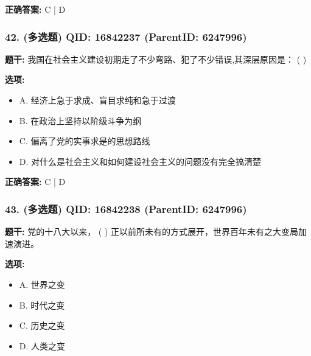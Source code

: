 \documentclass[12pt,UTF8]{ctexart}
\begin{document}
\textbf{正确答案:}
C | D

\vspace{0.3em}\hrulefill\vspace{0.7em}

\subsubsection*{42. (多选题) \small QID: 16842237 (ParentID: 6247996)}

\textbf{题干:}
我国在社会主义建设初期走了不少弯路、犯了不少错误,其深层原因是： ( )



\textbf{选项:}
\begin{itemize}[leftmargin=*]

  \item A. 经济上急于求成、盲目求纯和急于过渡

  \item B. 在政治上坚持以阶级斗争为纲

  \item C. 偏离了党的实事求是的思想路线

  \item D. 对什么是社会主义和如何建设社会主义的问题没有完全搞清楚

\end{itemize}

\textbf{正确答案:}
C | D

\vspace{0.3em}\hrulefill\vspace{0.7em}

\subsubsection*{43. (多选题) \small QID: 16842238 (ParentID: 6247996)}

\textbf{题干:}
党的十八大以来， ( ) 正以前所未有的方式展开，世界百年未有之大变局加速演进。



\textbf{选项:}
\begin{itemize}[leftmargin=*]

  \item A. 世界之变

  \item B. 时代之变

  \item C. 历史之变

  \item D. 人类之变

\end{itemize}
\end{document}
